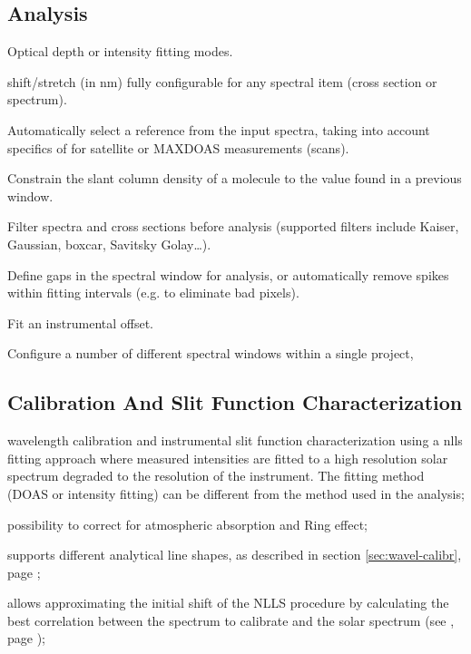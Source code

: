 \subsection{Analysis}
\begin{qdoasitem}
\item Optical depth or intensity fitting modes.
\item shift/stretch (in nm) fully configurable for any spectral item (cross section or spectrum).
\item Automatically select a reference from the input spectra, taking into account specifics of for satellite or MAXDOAS measurements (scans).
\item Constrain the slant column density of a molecule to the value found in a previous window.
\item Filter spectra and cross sections before analysis (supported filters include Kaiser, Gaussian, boxcar, Savitsky Golay…).
\item Define gaps in the spectral window for analysis, or automatically remove spikes within fitting intervals (e.g. to eliminate bad pixels).
\item Fit an instrumental offset.
\item Configure a number of different spectral windows within a single project,
\end{qdoasitem}
\subsection{Calibration And Slit Function Characterization}
\begin{qdoasitem}
\item wavelength calibration and instrumental slit function characterization using a \gls{nlls} fitting approach where measured intensities are fitted to a high resolution solar spectrum degraded to the resolution of the instrument. The fitting method (DOAS or intensity fitting) can be different from the method used in the analysis;
\item possibility to correct for atmospheric absorption and Ring effect;
\item supports different analytical line shapes, as described in section \ref{sec:wavel-calibr}, page \pageref{sec:wavel-calibr};
\item allows approximating the initial shift of the NLLS procedure by calculating the best correlation between the spectrum to calibrate and the solar spectrum (see , page \pageref{sec:projects_calibration_preshift});
\end{qdoasitem}

